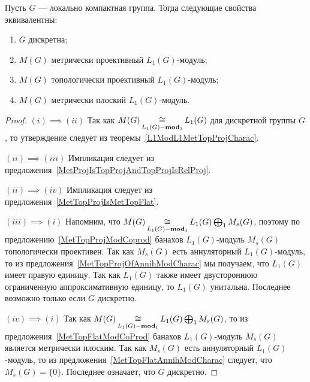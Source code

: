 \begin{proposition}\label{L1MetTopProjAndMetrFlatOfMeasAlg} Пусть $G$ ---
локально компактная группа. Тогда следующие свойства эквивалентны:

\begin{enumerate}[label = (\roman*)]
    \item $G$ дискретна;

    \item $M(G)$ метрически проективный $L_1(G)$-модуль;

    \item $M(G)$ топологически проективный $L_1(G)$-модуль;

    \item $M(G)$ метрически плоский $L_1(G)$-модуль.
\end{enumerate}
\end{proposition}
\begin{proof} 
$(i) \implies (ii)$ Так как $M(G)\mathop{\mathbin{\cong}}\limits_{L_1(G)-\mathbf{mod}_1}L_1(G)$ для
дискретной группы $G$, то утверждение следует из
теоремы~\ref{L1ModL1MetTopProjCharac}. 

$(ii) \implies (iii)$ Импликация следует из
предложения~\ref{MetProjIsTopProjAndTopProjIsRelProj}.

$(ii) \implies (iv)$ Импликация следует из
предложения~\ref{MetTopProjIsMetTopFlat}.

$(iii) \implies (i)$ Напомним, что $M(G)\mathop{\mathbin{\cong}}\limits_{L_1(G)-\mathbf{mod}_1}
L_1(G)\bigoplus_1 M_s(G)$, поэтому по предложению~\ref{MetTopProjModCoprod}
банахов $L_1(G)$-модуль $M_s(G)$ топологически проективен. Так как $M_s(G)$ есть
аннуляторный $L_1(G)$-модуль, то из предложения~\ref{MetTopProjOfAnnihModCharac}
мы получаем, что $L_1(G)$ имеет правую единицу. Так как $L_1(G)$ также имеет
двустороннюю ограниченную аппроксимативную единицу, то $L_1(G)$ унитальна.
Последнее возможно только если $G$ дискретно.

$(iv) \implies (i)$ Так как 
$M(G)\mathop{\mathbin{\cong}}\limits_{L_1(G)-\mathbf{mod}_1} L_1(G)\bigoplus_1 M_s(G)$, 
то из предложения~\ref{MetTopFlatModCoProd} банахов $L_1(G)$-модуль
$M_s(G)$ является метрически плоским. Так как $M_s(G)$ есть аннуляторный
$L_1(G)$-модуль, то из предложения~\ref{MetTopFlatAnnihModCharac} следует, что
$M_s(G)= \{0 \}$. Последнее означает, что $G$ дискретно.
\end{proof}


